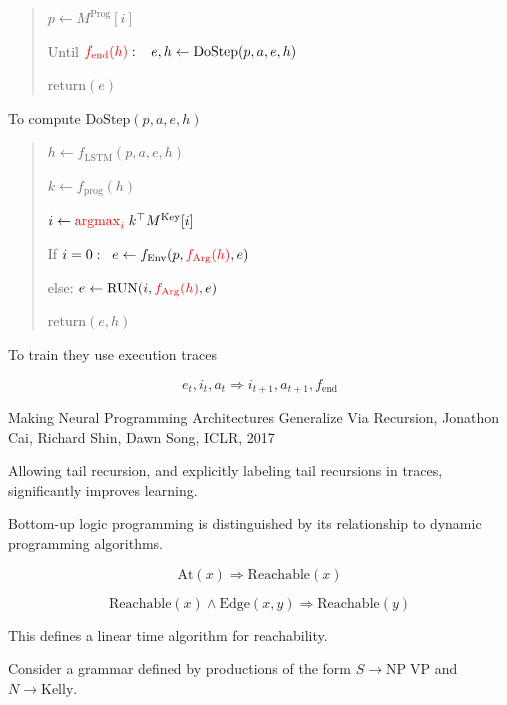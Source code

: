 {\begin{quotation}
$p \leftarrow  M^{\mathrm{Prog}}[i]$

\vfill
Until ${\color{red} f_{\mathrm{end}}(h)}: \;\;\;e,h \leftarrow \mathrm{DoStep}(p,a,e,h)$

\vfill
$\mathrm{return}(e)$
\end{quotation}


To compute $\mathrm{DoStep}(p,a,e,h)$

\vfill
\begin{quotation}
$h \leftarrow f_{\mathrm{LSTM}}(p,a,e,h)$

\vfill
$k \leftarrow f_{\mathrm{prog}}(h)$

\vfill
$i \leftarrow {\color{red} \operatorname*{argmax}_i}\; k^\top M^{\mathrm{Key}}[i]$

\vfill
If $i = 0:\;\;e \leftarrow f_{\mathrm{Env}}(p,{\color{red} f_\mathrm{Arg}(h)},e)$

\vfill
else: $e \leftarrow \mathrm{RUN}(i,{\color{red} f_\mathrm{Arg}(h)},e)$

\vfill
$\mathrm{return}(e,h)$
\end{quotation}


To train they use execution traces

\vfill
$$e_t, i_t, a_t \Rightarrow  i_{t+1},a_{t+1},f_{\mathrm{end}}$$


\vfill
Making Neural Programming Architectures
Generalize Via Recursion, Jonathon Cai, Richard Shin, Dawn Song, ICLR, 2017

\vfill
Allowing tail recursion, and explicitly labeling tail recursions in traces, significantly improves learning.


Bottom-up logic programming is distinguished by its relationship to dynamic programming algorithms.

\vfill
$$\mathrm{At}(x) \Rightarrow \mathrm{Reachable}(x)$$

\vfill
$$\mathrm{Reachable}(x) \wedge \mathrm{Edge}(x,y) \Rightarrow \mathrm{Reachable}(y)$$

\vfill
This defines a linear time algorithm for reachability.


Consider a grammar defined by productions of the form $S \rightarrow \mathrm{NP}\;\mathrm{VP}$ and $N \rightarrow \mathrm{Kelly}$.

}
